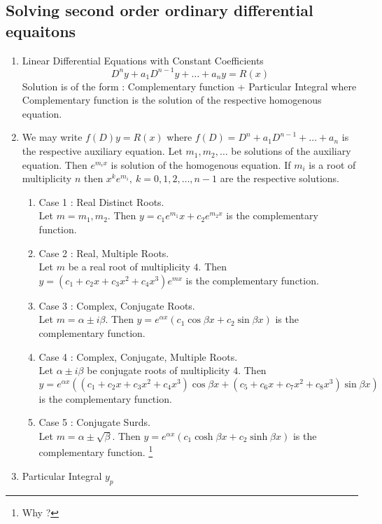 \subsection{Solving second order ordinary differential equaitons}
\begin{enumerate}
	\item Linear Differential Equations with Constant Coefficients
	\begin{equation} D^n y + a_1 D^{n-1} y + \dots + a_n y = R(x) \end{equation}
		Solution is of the form : Complementary function + Particular Integral where Complementary function is the solution of the respective homogenous equation.
	\item We may write $f(D)y = R(x)$ where $f(D) = D^n + a_1 D^{n-1} + \dots + a_n$ is the respective auxiliary equation.
		Let $m_1,m_2,\dots$ be solutions of the auxiliary equation. 
		Then $e^{m_i x}$ is solution of the homogenous equation. 
		If $m_i$ is a root of multiplicity $n$ then $x^ke^{m_i},\ k = 0,1,2,\dots, n-1$ are the respective solutions.
	\begin{enumerate}
		\item Case 1 : Real Distinct Roots.\\
			Let $m = m_1, m_2$. Then $y = c_1 e^{m_1}x + c_2 e^{m_2 x}$ is the complementary function.
		\item Case 2 : Real, Multiple Roots.\\
			Let $m$ be a real root of multiplicity $4$. Then $y = (c_1+c_2x+c_3x^2+c_4x^3) e^{m x}$ is the complementary function.
		\item Case 3 : Complex, Conjugate Roots.\\
			Let $m = \alpha \pm i \beta$. Then $y = e^{\alpha x} (c_1 \cos \beta x + c_2 \sin \beta x)$ is the complementary function.
		\item Case 4 : Complex, Conjugate, Multiple Roots.\\
			Let $\alpha \pm i \beta$ be conjugate roots of multiplicity $4$. Then $y = e^{\alpha x} ((c_1 + c_2 x + c_3 x^2 + c_4 x^3) \cos \beta x + (c_5 + c_6 x + c_7 x^2 + c_8 x^3) \sin \beta x)$ is the complementary function.
		\item {\color{red} Case 5 : Conjugate Surds.\\
			Let $m = \alpha \pm \sqrt{\beta}$. Then $y = e^{\alpha x}(c_1 \cosh \beta x + c_2 \sinh \beta x)$ is the complementary function. }\footnote{Why ?}
	\end{enumerate}
	\item Particular Integral $y_p$

\end{enumerate}
